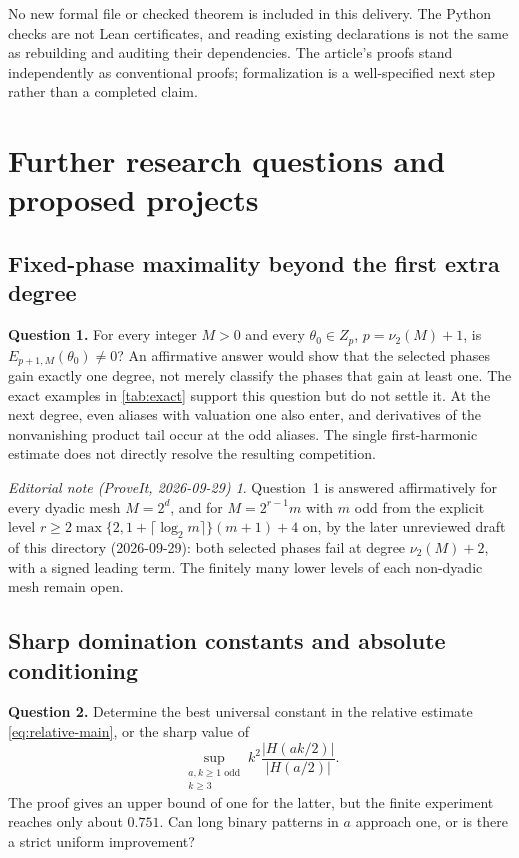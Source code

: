 \documentclass[11pt,a4paper]{article}
\numberwithin{equation}{section}
\theoremstyle{plain}
\theoremstyle{definition}
\theoremstyle{remark}
\newtheorem*{ednote}{Editorial note (ProveIt, 2026-09-29)}
\begin{document}
No new formal file or checked theorem is included in this delivery. The
Python checks are not Lean certificates, and reading existing declarations
is not the same as rebuilding and auditing their dependencies. The article's
proofs stand independently as conventional proofs; formalization is a
well-specified next step rather than a completed claim.

\section{Further research questions and proposed projects}
\label{sec:research}

\subsection{Fixed-phase maximality beyond the first extra degree}

\textbf{Question 1.} For every integer $M>0$ and every
$\theta_0\in Z_p$, $p=\nu_2(M)+1$, is
$E_{p+1,M}(\theta_0)\ne0$? An affirmative answer would show that the
selected phases gain exactly one degree, not merely classify the phases
that gain at least one. The exact examples in \cref{tab:exact} support
this question but do not settle it. At the next degree, even aliases with
valuation one also enter, and derivatives of the nonvanishing product
tail occur at the odd aliases. The single first-harmonic estimate does
not directly resolve the resulting competition.

\begin{ednote}
Question~1 is answered affirmatively for every dyadic mesh $M=2^d$, and
for $M=2^{r-1}m$ with $m$ odd from the explicit level
$r\ge2\max\{2,1+\lceil\log_2m\rceil\}(m+1)+4$ on, by the later
unreviewed draft  of this
directory (2026-09-29): both selected phases fail at degree $\nu_2(M)+2$,
with a signed leading term. The finitely many lower levels of each
non-dyadic mesh remain open.
\end{ednote}

\subsection{Sharp domination constants and absolute conditioning}

\textbf{Question 2.} Determine the best universal constant in the
relative estimate \eqref{eq:relative-main}, or the sharp value of
\[
 \sup_{\substack{a,k\ge1\text{ odd}\\k\ge3}}
 k^2\frac{|H(ak/2)|}{|H(a/2)|}.
\]
The proof gives an upper bound of one for the latter, but the finite
experiment reaches only about $0.751$. Can long binary patterns in $a$
approach one, or is there a strict uniform improvement?
\end{document}
